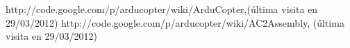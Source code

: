 \documentclass{article}
\begin{document}
\begin{thebibliography}{2}

    http://code.google.com/p/arducopter/wiki/ArduCopter,(última visita en 29/03/2012)
http://code.google.com/p/arducopter/wiki/AC2Assembly, (última visita en 29/03/2012)
\end{thebibliography}
\end{document}
